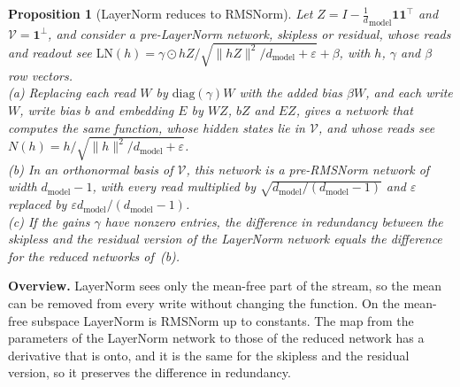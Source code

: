 \documentclass[10pt]{article}
\newtheorem{proposition}[theorem]{Proposition}
\theoremstyle{definition}
\theoremstyle{remark}
\newcommand{\dm}{d_{\mathrm{model}}}
\newcommand{\norm}[1]{\lVert #1\rVert}
\newcommand{\para}[1]{\smallskip\noindent\textbf{#1}\hspace{0.5em}}
\begin{document}
\begin{proposition}[LayerNorm reduces to RMSNorm]\label{prop:ln}
Let $Z = I - \tfrac1\dm\mathbf 1\mathbf 1^\top$ and $\mathcal V = \mathbf 1^\perp$, and consider a pre-LayerNorm network, skipless or residual, whose reads and readout see $\mathrm{LN}(h) = \gamma\odot hZ/\sqrt{\norm{hZ}^2/\dm + \varepsilon} + \beta$, with $h$, $\gamma$ and $\beta$ row vectors.\\
\textup{(a)} Replacing each read $W$ by $\mathrm{diag}(\gamma)W$ with the added bias $\beta W$, and each write $W$, write bias $b$ and embedding $E$ by $WZ$, $bZ$ and $EZ$, gives a network that computes the same function, whose hidden states lie in $\mathcal V$, and whose reads see $N(h) = h/\sqrt{\norm{h}^2/\dm + \varepsilon}$.\\
\textup{(b)} In an orthonormal basis of $\mathcal V$, this network is a pre-RMSNorm network of width $\dm-1$, with every read multiplied by $\sqrt{\dm/(\dm-1)}$ and $\varepsilon$ replaced by $\varepsilon \dm/(\dm-1)$.\\
\textup{(c)} If the gains $\gamma$ have nonzero entries, the difference in redundancy between the skipless and the residual version of the LayerNorm network equals the difference for the reduced networks of~(b).
\end{proposition}

\para{Overview.} LayerNorm sees only the mean-free part of the stream, so the mean can be removed from every write without changing the function. On the mean-free subspace LayerNorm is RMSNorm up to constants. The map from the parameters of the LayerNorm network to those of the reduced network has a derivative that is onto, and it is the same for the skipless and the residual version, so it preserves the difference in redundancy.
\end{document}
